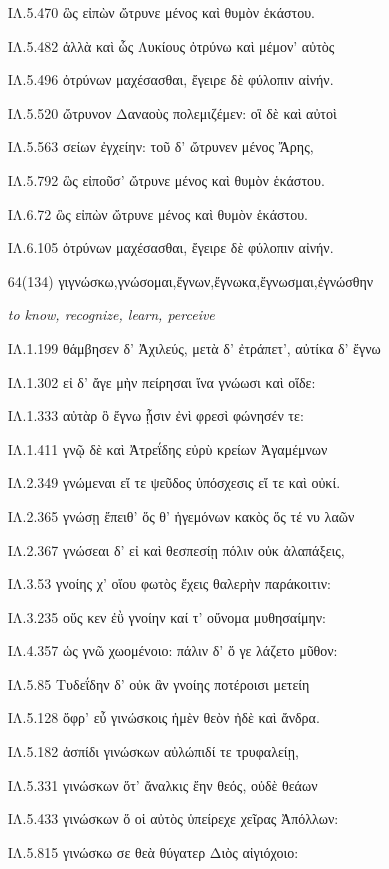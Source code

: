 \begin{enumerate}
{ΙΛ.5.470 ὣς εἰπὼν ὤτρυνε μένος καὶ θυμὸν ἑκάστου. 

ΙΛ.5.482 ἀλλὰ καὶ ὧς Λυκίους ὀτρύνω καὶ μέμον' αὐτὸς 

ΙΛ.5.496 ὀτρύνων μαχέσασθαι, ἔγειρε δὲ φύλοπιν αἰνήν. 

ΙΛ.5.520 ὤτρυνον Δαναοὺς πολεμιζέμεν: οἳ δὲ καὶ αὐτοὶ 

ΙΛ.5.563 σείων ἐγχείην: τοῦ δ' ὤτρυνεν μένος Ἄρης, 

ΙΛ.5.792 ὣς εἰποῦσ' ὤτρυνε μένος καὶ θυμὸν ἑκάστου. 

ΙΛ.6.72 ὣς εἰπὼν ὤτρυνε μένος καὶ θυμὸν ἑκάστου. 

ΙΛ.6.105 ὀτρύνων μαχέσασθαι, ἔγειρε δὲ φύλοπιν αἰνήν. 

}

\clearpage
\item[\large 64(134)]{\large \g γιγνώσκω,γνώσομαι,ἔγνων,ἔγνωκα,ἔγνωσμαι,ἐγνώσθην}

\hspace{0.2cm} \textit{  to know, recognize, learn, perceive}

{\g
ΙΛ.1.199 θάμβησεν δ' Ἀχιλεύς, μετὰ δ' ἐτράπετ', αὐτίκα δ' ἔγνω 

ΙΛ.1.302 εἰ δ' ἄγε μὴν πείρησαι ἵνα γνώωσι καὶ οἵδε: 

ΙΛ.1.333 αὐτὰρ ὃ ἔγνω ᾗσιν ἐνὶ φρεσὶ φώνησέν τε: 

ΙΛ.1.411 γνῷ δὲ καὶ Ἀτρεΐδης εὐρὺ κρείων Ἀγαμέμνων 

ΙΛ.2.349 γνώμεναι εἴ τε ψεῦδος ὑπόσχεσις εἴ τε καὶ οὐκί. 

ΙΛ.2.365 γνώσῃ ἔπειθ' ὅς θ' ἡγεμόνων κακὸς ὅς τέ νυ λαῶν 

ΙΛ.2.367 γνώσεαι δ' εἰ καὶ θεσπεσίῃ πόλιν οὐκ ἀλαπάξεις, 

ΙΛ.3.53 γνοίης χ' οἵου φωτὸς ἔχεις θαλερὴν παράκοιτιν: 

ΙΛ.3.235 οὕς κεν ἐῢ γνοίην καί τ' οὔνομα μυθησαίμην: 

ΙΛ.4.357 ὡς γνῶ χωομένοιο: πάλιν δ' ὅ γε λάζετο μῦθον: 

ΙΛ.5.85 Τυδεΐδην δ' οὐκ ἂν γνοίης ποτέροισι μετείη 

ΙΛ.5.128 ὄφρ' εὖ γινώσκοις ἠμὲν θεὸν ἠδὲ καὶ ἄνδρα. 

ΙΛ.5.182 ἀσπίδι γινώσκων αὐλώπιδί τε τρυφαλείῃ, 

ΙΛ.5.331 γινώσκων ὅτ' ἄναλκις ἔην θεός, οὐδὲ θεάων 

ΙΛ.5.433 γινώσκων ὅ οἱ αὐτὸς ὑπείρεχε χεῖρας Ἀπόλλων: 

ΙΛ.5.815 γινώσκω σε θεὰ θύγατερ Διὸς αἰγιόχοιο: 

}
\end{enumerate}
